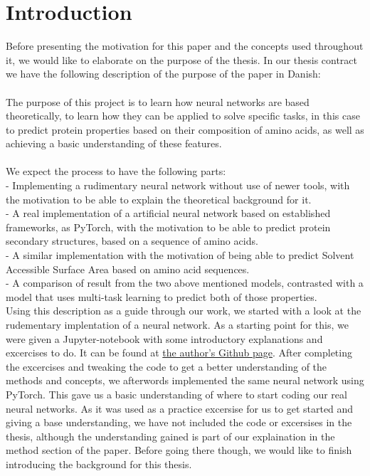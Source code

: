 \section{Introduction}
Before presenting the motivation for this paper and the concepts used throughout it, we would like to elaborate on the purpose of the thesis. In our thesis contract we have the following description of the purpose of the paper in Danish:\\\\
The purpose of this project is to learn how neural networks are based theoretically, to learn how they can be applied to solve specific tasks, in this case to predict protein properties based on their composition of amino acids, as well as achieving a basic understanding of these features. \\\\
We expect the process to have the following parts:\\
- Implementing a rudimentary neural network without use of newer tools, with the motivation to be able to explain the theoretical background for it.\\
- A real implementation of a artificial neural network based on established frameworks, as PyTorch, with the motivation to be able to predict protein secondary structures, based on a sequence of amino acids. \\
- A similar implementation with the motivation of being able to predict Solvent Accessible Surface Area based on amino acid sequences. \\
- A comparison of result from the two above mentioned models, contrasted with a model that uses multi-task learning to predict both of those properties.\\ 

Using this description as a guide through our work, we started with a look at the rudementary implentation of a neural network. As a starting point for this, we were given a Jupyter-notebook with some introductory explanations and excercises to do.
It can be found at \href{https://github.com/dennybritz/nn-from-scratch/blob/master/nn-from-scratch.ipynb}{the author's Github page}.
After completing the excercises and tweaking the code to get a better understanding of the methods and concepts, we afterwords implemented the same neural network using PyTorch. 
This gave us a basic understanding of where to start coding our real neural networks. As it was used as a practice excersise for us to get started and giving a base understanding, we have not included the code or excersises in the thesis, although the understanding gained is part of our explaination in the method section of the paper. Before going there though, we would like to finish introducing the background for this thesis.

